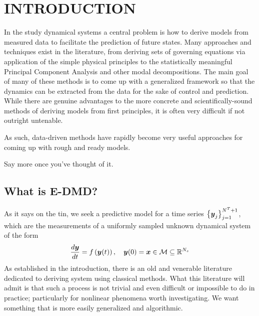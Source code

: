 %

\chapter{INTRODUCTION}
\label{chap:intro}

In the study dynamical systems a central problem is how to derive models 
from measured data to facilitate the prediction of future states. Many 
approaches and techniques exist in the literature, from deriving sets of 
governing equations via application of the simple physical principles to 
the statistically meaningful Principal Component Analysis and other modal 
decompositions. The main goal of many of these methods is to come up with 
a generalized framework so that the dynamics can be extracted from the data
for the sake of control and prediction. While there are genuine advantages
to the more concrete and scientifically-sound methods of deriving models 
from first principles, it is often very difficult if not outright untenable.

As such, data-driven methods have rapidly become very useful approaches for 
coming up with rough and ready models. 

Say more once you've thought of it.

\section{What is E-DMD?}
As it says on the tin, we seek a predictive model for a time series $\left\{
\boldsymbol{y}_j\right\}_{j=1}^{N^T+1}$, which are the measurements of a uniformly 
sampled unknown dynamical system of the form
$$\frac{d\boldsymbol{y}}{dt} = f\left(\boldsymbol{y}(t)\right),\quad \boldsymbol{y}(0) 
= \boldsymbol{x} \in \mathcal{M} \subseteq \mathbb{R}^{N_s}$$
As established in the introduction, there is an old and venerable literature 
dedicated to deriving system using classical methods. What this literature will 
admit is that such a process is not trivial and even difficult or impossible to 
do in practice; particularly for nonlinear phenomena worth investigating. We 
want something that is more easily generalized and algorithmic.

